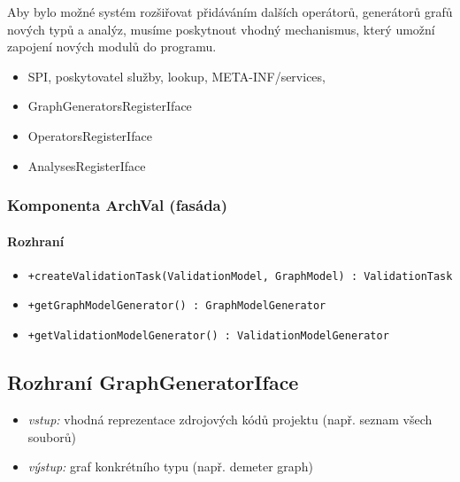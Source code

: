 Aby bylo možné systém rozšiřovat přidáváním dalších operátorů, generátorů grafů nových typů a analýz, musíme poskytnout vhodný mechanismus, který umožní zapojení nových modulů do programu.
\begin{itemize}
\item SPI, poskytovatel služby, lookup, META-INF/services,
\end{itemize}

\begin{itemize}
\item GraphGeneratorsRegisterIface
\item OperatorsRegisterIface
\item AnalysesRegisterIface
\end{itemize}

\subsubsection{Komponenta ArchVal (fasáda)}
\paragraph{Rozhraní}
\begin{itemize}
\item \verb-+createValidationTask(ValidationModel, GraphModel) : ValidationTask-
\item \verb-+getGraphModelGenerator() : GraphModelGenerator-
\item \verb-+getValidationModelGenerator() : ValidationModelGenerator-
\end{itemize}

\subsection{Rozhraní GraphGeneratorIface}
\begin{itemize}
\item \emph{vstup:} vhodná reprezentace zdrojových kódů projektu (např. seznam všech souborů)
\item \emph{výstup:} graf konkrétního typu (např. demeter graph)
\end{itemize}

